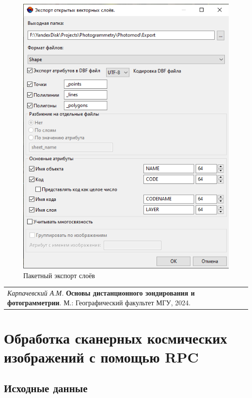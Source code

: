 \documentclass[
  12pt,
]{book}
\begin{document}
\begin{figure}
\centering
\includegraphics{images/Ref16/Export.png}
\caption{Пакетный экспорт слоёв}
\end{figure}

\begin{longtable}[]{@{}l@{}}
\toprule\noalign{}
\endhead
\bottomrule\noalign{}
\endlastfoot
\emph{Карпачевский А.М.} \textbf{Основы дистанционного зондирования и фотограмметрии}. М.: Географический факультет МГУ, 2024. \\
\end{longtable}

\hypertarget{rpc}{%
\chapter{Обработка сканерных космических изображений с помощью RPC}\label{rpc}}

\hypertarget{rpc-initial}{%
\section{Исходные данные}\label{rpc-initial}}
\end{document}
